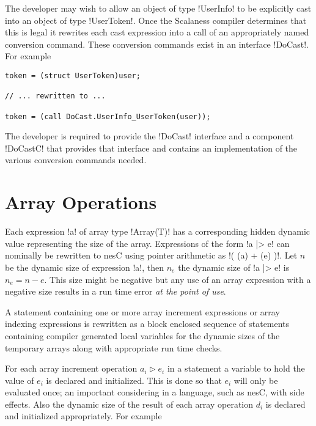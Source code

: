 The developer may wish to allow an object of type !UserInfo! to be explicitly cast into an
object of type !UserToken!. Once the Scalaness compiler determines that this is legal it
rewrites each cast expression into a call of an appropriately named conversion command. These
conversion commands exist in an interface !DoCast!. For example

\singlespace
\begin{lstlisting}[language=nesC]
token = (struct UserToken)user;

// ... rewritten to ...

token = (call DoCast.UserInfo_UserToken(user));
\end{lstlisting}
\primaryspacing

The developer is required to provide the !DoCast! interface and a component !DoCastC! that
provides that interface and contains an implementation of the various conversion commands
needed.


\section{Array Operations}
\label{section-array-operations-implementation}

Each expression !a! of array type !Array(T)! has a corresponding hidden dynamic value
representing the size of the array. Expressions of the form !a |> e! can nominally be rewritten
to nesC using pointer arithmetic as !( (a) + (e) )!. Let $n$ be the dynamic size of expression
!a!, then $n_e$ the dynamic size of !a |> e! is $n_e = n - e$. This size might be negative but
any use of an array expression with a negative size results in a run time error \emph{at the
  point of use}.

A statement containing one or more array increment expressions or array indexing expressions is
rewritten as a block enclosed sequence of statements containing compiler generated local
variables for the dynamic sizes of the temporary arrays along with appropriate run time checks.

For each array increment operation $a_i \rhd e_i$ in a statement a variable to hold the value of
$e_i$ is declared and initialized. This is done so that $e_i$ will only be evaluated once; an
important considering in a language, such as nesC, with side effects. Also the dynamic size of
the result of each array operation $d_i$ is declared and initialized appropriately. For example

